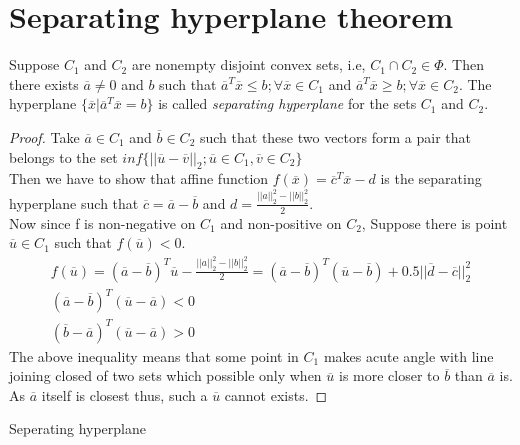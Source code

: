 \documentclass{tufte-handout}
\theoremstyle{remark}
\begin{document}
\section{Separating hyperplane theorem}
Suppose $C_1$ and $C_2$ are nonempty disjoint convex sets, i.e, $C_1 \cap C_2 \in \Phi$. Then there exists $\overline{a} \neq 0$ and $b$ such that $\overline{a}^T\overline{x} \le b; \forall \overline{x} \in C_1$ and $\overline{a}^T\overline{x} \ge b; \forall \overline{x} \in C_2$. The hyperplane $\{\overline{x} | \overline{a}^T\overline{x} = b\}$ is called \textit{separating hyperplane} for the sets $C_1$ and $C_2$.\\
\begin{proof}
    Take $\overline{a} \in C_1$ and $\overline{b} \in C_2$ such that these two vectors form a pair that belongs to the set $inf\{||\overline{u}-\overline{v}||_2 ; \overline{u} \in C_1, \overline{v} \in C_2\}$ \\
    Then we have to show that affine function $f(\overline{x}) = \overline{c}^T\overline{x} - d$ is the separating hyperplane such that $\overline{c} = \overline{a} - \overline{b}$ and $d = \frac{||a||_2^2 - ||b||_2^2}{2}$.\\
    Now since f is non-negative on $C_1$ and non-positive on $C_2$, Suppose there is point $\overline{u} \in C_1$ such that $f(\overline{u}) < 0$.\\
    \begin{gather*}
        f(\overline{u}) = (\overline{a} - \overline{b})^T\overline{u} - \frac{||a||_2^2 - ||b||_2^2}{2} = (\overline{a} - \overline{b})^T(\overline{u}-\overline{b}) + 0.5||\overline{d}-\overline{c}||_2^2\\
        (\overline{a} - \overline{b})^T(\overline{u}-\overline{a}) < 0\\
        (\overline{b} - \overline{a})^T(\overline{u}-\overline{a}) > 0
    \end{gather*}
    The above inequality means that some point in $C_1$ makes acute angle with line joining closed of two sets which possible only when $\overline{u}$ is more closer to $\overline{b}$ than $\overline{a}$ is. As $\overline{a}$ itself is closest thus, such a $\overline{u}$ cannot exists.
\end{proof}
\begin{marginfigure}
\caption{Seperating hyperplane}
\end{marginfigure}
\end{document}

